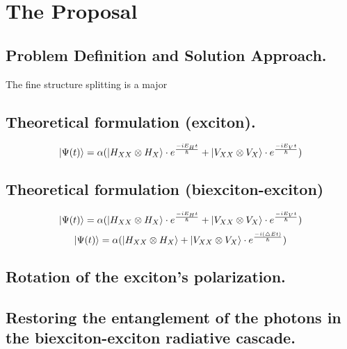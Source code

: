\section{The Proposal}
\subsection{Problem Definition and Solution Approach.}
The fine structure splitting is a major 	
\subsection{Theoretical formulation (exciton).}
\begin{equation}
	\ket{\Psi(t)} = \alpha(\ket{H_{XX} \otimes  H_X}\cdot e^{\frac{-iE_H t}{\hslash}}+\ket{V_{XX}\otimes V_X}\cdot e^{\frac{-iE_Vt}{\hslash}})
\end{equation}
\subsection{Theoretical formulation (biexciton-exciton)}
	\begin{equation}
	\ket{\Psi(t)} = \alpha(\ket{H_{XX} \otimes  H_X}\cdot e^{\frac{-iE_H t}{\hslash}}+\ket{V_{XX}\otimes V_X}\cdot e^{\frac{-iE_Vt}{\hslash}})
	\end{equation}
\begin{equation}
	\ket{\Psi(t)} = \alpha(\ket{H_{XX} \otimes H_X}+\ket{V_{XX}\otimes V_X}\cdot e^{\frac{-i(\triangle Et)}{\hslash}})
\end{equation}
\subsection{Rotation of the exciton's polarization.}
\subsection{Restoring the entanglement of the photons in the biexciton-exciton radiative cascade.}

